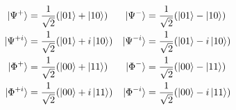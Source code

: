 \documentclass[preview, border={5pt,5pt,5pt,5pt}]{standalone}
\begin{document}
$
\begin{aligned}
    \ket{\Psi^+}&=\frac{1}{\sqrt{2}}(\ket{01} + \ket{10}) & \ket{\Psi^{-}}&=\frac{1}{\sqrt{2}}(\ket{01} - \ket{10}) \\
    \ket{\Psi^{+i}}&=\frac{1}{\sqrt{2}}(\ket{01} + i\ket{10}) & \ket{\Psi^{-i}}&=\frac{1}{\sqrt{2}}(\ket{01} - i\ket{10})\\
    \ket{\Phi^+}&=\frac{1}{\sqrt{2}}(\ket{00} + \ket{11}) & \ket{\Phi^{-}}&=\frac{1}{\sqrt{2}}(\ket{00} - \ket{11})\\
    \ket{\Phi^{+i}}&=\frac{1}{\sqrt{2}}(\ket{00} + i\ket{11}) & \ket{\Phi^{-i}}&=\frac{1}{\sqrt{2}}(\ket{00} - i\ket{11})
\end{aligned}
$
\end{document}
